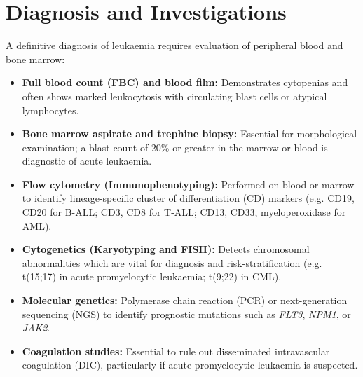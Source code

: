 \section*{Diagnosis and Investigations}
A definitive diagnosis of leukaemia requires evaluation of peripheral blood and bone marrow:
\begin{itemize}
    \item \textbf{Full blood count (FBC) and blood film:} Demonstrates cytopenias and often shows marked leukocytosis with circulating blast cells or atypical lymphocytes.
    \item \textbf{Bone marrow aspirate and trephine biopsy:} Essential for morphological examination; a blast count of 20\% or greater in the marrow or blood is diagnostic of acute leukaemia.
    \item \textbf{Flow cytometry (Immunophenotyping):} Performed on blood or marrow to identify lineage-specific cluster of differentiation (CD) markers (e.g. CD19, CD20 for B-ALL; CD3, CD8 for T-ALL; CD13, CD33, myeloperoxidase for AML).
    \item \textbf{Cytogenetics (Karyotyping and FISH):} Detects chromosomal abnormalities which are vital for diagnosis and risk-stratification (e.g. t(15;17) in acute promyelocytic leukaemia; t(9;22) in CML).
    \item \textbf{Molecular genetics:} Polymerase chain reaction (PCR) or next-generation sequencing (NGS) to identify prognostic mutations such as \textit{FLT3}, \textit{NPM1}, or \textit{JAK2}.
    \item \textbf{Coagulation studies:} Essential to rule out disseminated intravascular coagulation (DIC), particularly if acute promyelocytic leukaemia is suspected.
\end{itemize}

